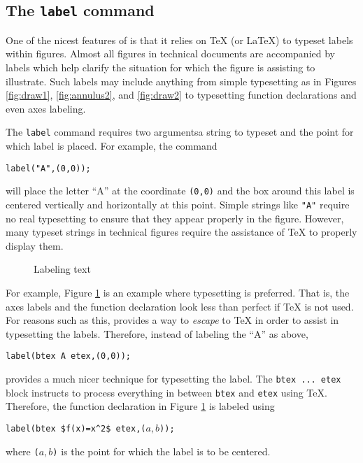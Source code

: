 \subsection{The \texttt{label} command}

One of the nicest features of \MP{} is that it relies on \TeX{} (or \LaTeX) to typeset labels within figures.  Almost all figures in technical documents are accompanied by labels which help clarify the situation for which the figure is assisting to illustrate.  Such labels may include anything from simple typesetting as in Figures \ref{fig:draw1}, \ref{fig:annulus2}, and \ref{fig:draw2} to typesetting function declarations and even axes labeling.

The \texttt{label} command requires two arguments\Dash a string to typeset and the point for which label is placed.  For example, the command \begin{center}\verb|label("A",(0,0));|\end{center} will place the letter ``A'' at the coordinate \texttt{(0,0)} and the box around this label is centered vertically and horizontally at this point.  Simple strings like \texttt{"A"} require no real typesetting to ensure that they appear properly in the figure.  However, many typeset strings in technical figures require the assistance of \TeX{} to properly display them.
\begin{figure}[hptb]
	\begin{center}\end{center}
	\caption{Labeling text}\label{fig:parabola}
\end{figure}
For example, Figure \ref{fig:parabola} is an example where typesetting is preferred.  That is, the axes labels and the function declaration look less than perfect if \TeX{} is not used.  For reasons such as this, \MP{} provides a way to \textit{escape} to \TeX{} in order to assist in typesetting the labels.  Therefore, instead of labeling the ``A'' as above, \begin{center}\verb|label(btex A etex,(0,0));|\end{center} provides a much nicer technique for typesetting the label.  The \texttt{btex\,...\,etex} block instructs \MP{} to process everything in between \texttt{btex} and \texttt{etex} using \TeX.  Therefore, the function declaration in Figure \ref{fig:parabola} is labeled using \begin{center}\verb|label(btex $f(x)=x^2$ etex,(|$a,b$\verb|));|\end{center} where \verb|(|$a,b$\verb|)| is the point for which the label is to be centered.

